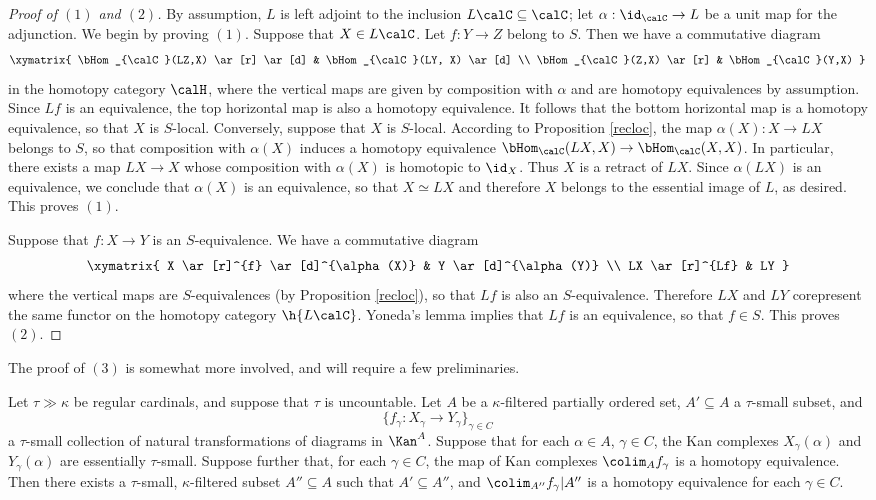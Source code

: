 \begin{proof}[Proof of $(1)$ and $(2)$]
By assumption, $L$ is left adjoint to the inclusion $L \calC \subseteq \calC$; let
$\alpha: \id_{\calC} \rightarrow L$ be a unit map for the adjunction. We begin by proving $(1)$.
Suppose that $X \in L \calC$. Let $f: Y \rightarrow Z$ belong to $S$. Then we have a commutative diagram
$$ \xymatrix{ \bHom_{\calC}(LZ,X) \ar[r] \ar[d] & \bHom_{\calC}(LY, X) \ar[d] \\
\bHom_{\calC}(Z,X) \ar[r] & \bHom_{\calC}(Y,X) }$$
in the homotopy category $\calH$, where the vertical maps are given by composition with $\alpha$ and are homotopy equivalences by assumption. Since $Lf$ is an equivalence, the top horizontal map is also a homotopy equivalence. It follows that the bottom horizontal map is a homotopy equivalence, so that $X$ is $S$-local. Conversely, suppose that $X$ is $S$-local. According to Proposition \ref{recloc}, the map $\alpha(X): X \rightarrow LX$ belongs to $S$, so that composition with $\alpha(X)$ induces a homotopy equivalence $\bHom_{\calC}(LX,X) \rightarrow \bHom_{\calC}(X,X)$. In particular, there exists a map $LX \rightarrow X$ whose composition
with $\alpha(X)$ is homotopic to $\id_{X}$. Thus $X$ is a retract of $LX$. Since $\alpha(LX)$
is an equivalence, we conclude that $\alpha(X)$ is an equivalence, so that $X \simeq LX$ and
therefore $X$ belongs to the essential image of $L$, as desired. This proves $(1)$.

Suppose that $f: X \rightarrow Y$ is an $S$-equivalence. 
We have a commutative diagram $$ \xymatrix{ X \ar[r]^{f} \ar[d]^{\alpha(X)} & Y \ar[d]^{\alpha(Y)} \\
LX \ar[r]^{Lf} & LY }$$
where the vertical maps are $S$-equivalences (by Proposition \ref{recloc}), so that $Lf$
is also an $S$-equivalence. Therefore $LX$ and $LY$ corepresent the same functor
on the homotopy category $\h{L \calC}$. Yoneda's lemma implies that $Lf$ is an equivalence, so that $f \in S$. This proves $(2)$.
\end{proof}

The proof of $(3)$ is somewhat more involved, and will require a few preliminaries.

\begin{lemma}\label{neelda}
Let $\tau \gg \kappa$ be regular cardinals, and suppose that $\tau$ is uncountable. Let $A$ be a $\kappa$-filtered partially ordered set, $A' \subseteq A$ a $\tau$-small subset, and
$$ \{ f_{\gamma}: X_{\gamma} \rightarrow Y_{\gamma} \}_{ \gamma \in C}$$ a $\tau$-small collection of natural transformations of diagrams in $\Kan^{A}$. Suppose that for each
$\alpha \in A$, $\gamma \in C$, the Kan complexes $X_{\gamma}(\alpha)$ and
$Y_{\gamma}(\alpha)$ are essentially $\tau$-small.
Suppose further that, for each $\gamma \in C$, the map of Kan complexes $\colim_{A} f_{\gamma}$
is a homotopy equivalence. Then there exists a $\tau$-small, $\kappa$-filtered subset
$A'' \subseteq A$ such that $A' \subseteq A''$, and $\colim_{A''} f_{\gamma}|A''$ 
is a homotopy equivalence for each $\gamma \in C$.
\end{lemma}

